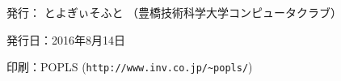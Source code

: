 \thispagestyle{empty}
\begin{flushright}
    \begin{description}
      \item{発行：} とよぎぃそふと （豊橋技術科学大学コンピュータクラブ）
      \item{発行日：}2016年8月14日
      \item{印刷：}POPLS (\verb|http://www.inv.co.jp/~popls/|)
    \end{description}
\end{flushright}
